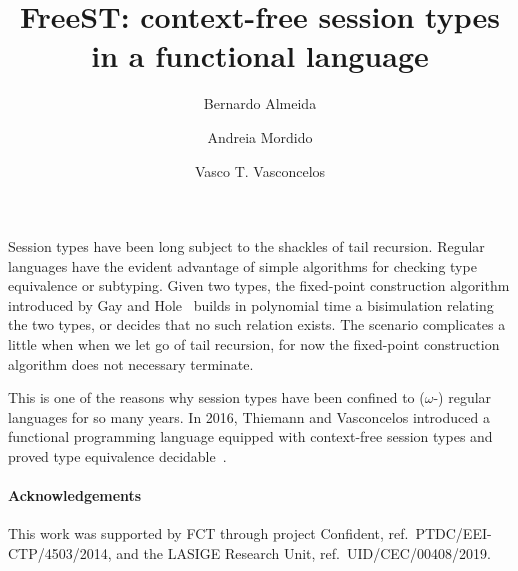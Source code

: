 \documentclass[submission,copyright,creativecommons]{eptcs}
\title{FreeST: context-free session types in a functional language}
\author{
  Bernardo Almeida
  \and
  Andreia Mordido
  \and
  Vasco T. Vasconcelos
  \institute{LASIGE, Faculdade de Ciências, Universidade de Lisboa, Portugal}
}
\begin{document}
\maketitle

Session types have been long subject to the shackles of tail
recursion. Regular languages have the evident advantage of simple
algorithms for checking type equivalence or subtyping. Given two
types, the fixed-point construction algorithm introduced by Gay and
Hole~\cite{acta} builds in polynomial time a bisimulation relating the
two types, or decides that no such relation exists. The scenario
complicates a little when when we let go of tail recursion, for now
the fixed-point construction algorithm does not necessary terminate.

This is one of the reasons why session types have been confined to
($\omega$-) regular languages for so many years. In 2016, Thiemann and
Vasconcelos introduced a functional programming language equipped with
context-free session types and proved type equivalence
decidable~\cite{tv}.

\paragraph{Acknowledgements}

This work was supported by FCT through project Confident, ref.\
PTDC/EEI-CTP/4503/2014, and the LASIGE Research Unit, ref.\
UID/CEC/00408/2019.
\end{document}
